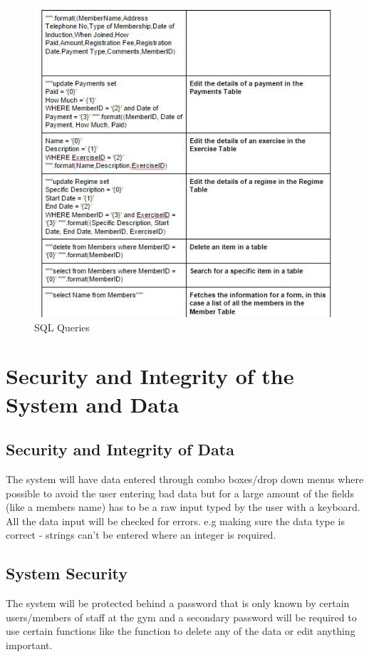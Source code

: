 \begin{itemize}
\begin{figure}[H]
    \includegraphics[width=\textwidth]{Queries2.JPG}
    \caption{SQL Queries} \label{fig:SQL Queries}
\end{figure}

\section{Security and Integrity of the System and Data}

\subsection{Security and Integrity of Data}
The system will have data entered through combo boxes/drop down menus where possible to avoid the user entering bad data but for a large amount of the fields (like a members name) has to be a raw input typed by the user with a keyboard. All the data input will be checked for errors. e.g making sure the data type is correct - strings can't be entered where an integer is required. 

\subsection{System Security}
The system will be protected behind a password that is only known by certain users/members of staff at the gym and a secondary password will be required to use certain functions like the function to delete any of the data or edit anything important.


\end{itemize}
